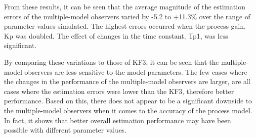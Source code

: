 From these results, it can be seen that the average magnitude of the estimation errors of the multiple-model observers varied by -5.2 to +11.3\% over the range of parameter values simulated. The highest errors occurred when the process gain, \gls{Kp} was doubled. The effect of changes in the time constant, \gls{Tp1}, was less significant.

By comparing these variations to those of KF3, it can be seen that the multiple-model observers are less sensitive to the model parameters. The few cases where the changes in the performance of the multiple-model observers are larger, are all cases where the estimation errors were lower than the KF3, therefore better performance. Based on this, there does not appear to be a significant downside to the multiple-model observers when it comes to the accuracy of the process model. In fact, it shows that better overall estimation performance may have been possible with different parameter values.

